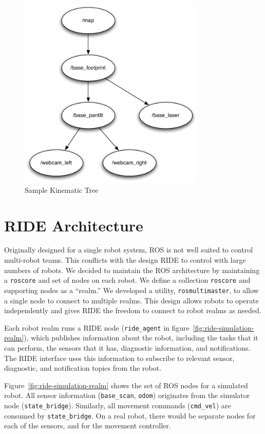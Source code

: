 \begin{figure}[ht]
\begin{center}
\includegraphics[width=3.5in]{images/tf-example.pdf}
\caption{Sample Kinematic Tree\label{fig:tf-example}}
\end{center}
\end{figure}

\section{RIDE Architecture}
\label{sec:ride_code}
Originally designed for a single robot system, ROS is not well suited to control multi-robot teams. This conflicts with the design RIDE to control with large numbers of robots. We decided to maintain the ROS architecture by maintaining a \verb!roscore! and set of nodes on each robot. We define a collection \verb!roscore! and supporting nodes as a ``realm.'' We developed a utility, \verb!rosmultimaster!, to allow a single node to connect to multiple realms. This design allows robots to operate independently and gives RIDE the freedom to connect to robot realms as needed.

Each robot realm runs a RIDE node (\verb!ride_agent! in figure~\ref{fig:ride-simulation-realm}), which publishes information about the robot, including the tasks that it can perform, the sensors that it has, diagnostic information, and notifications. The RIDE interface uses this information to subscribe to relevant sensor, diagnostic, and notification topics from the robot.

Figure~\ref{fig:ride-simulation-realm} shows the set of ROS nodes for a simulated robot. All sensor information (\verb!base_scan!, \verb!odom!) originates from the simulator node (\verb!state_bridge!). Similarly, all movement commands (\verb!cmd_vel!) are consumed by \verb!state_bridge!. On a real robot, there would be separate nodes for each of the sensors, and for the movement controller.

